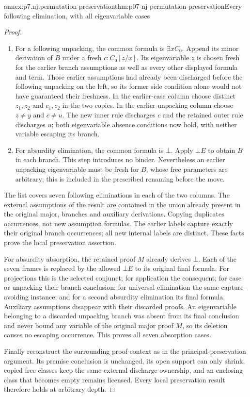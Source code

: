 \begin{annexitem}{annex:p7.nj.permutation-preservation}{thm:p07-nj-permutation-preservation}{Every following elimination, with all eigenvariable cases}
\begin{proof}
\begin{enumerate}
renamed. Thus moving the instantiation does not capture them.
The registered total substitution determines the same instance
in each branch.
\item For a following unpacking, the common formula is
\(\exists x C_0\). Append its minor derivation of \(B\)
under a fresh \(c:C_0[z/x]\). Its eigenvariable \(z\)
is chosen fresh for the earlier branch assumptions as well
as every other displayed formula and term. Those earlier
assumptions had already been discharged before the following
unpacking on the left, so its former side condition alone
would not have guaranteed their freshness. In the earlier-case
column choose distinct \(z_1,z_2\) and \(c_1,c_2\) in the
two copies. In the earlier-unpacking column choose \(z\ne y\)
and \(c\ne u\). The new inner rule discharges \(c\) and
the retained outer rule discharges \(u\); both eigenvariable
absence conditions now hold, with neither variable escaping
its branch.
\item For absurdity elimination, the common formula is
\(\bot\). Apply \(\bot E\) to obtain \(B\) in each
branch. This step introduces no binder. Nevertheless an earlier
unpacking eigenvariable must be fresh for \(B\), whose free
parameters are arbitrary; this is included in the prescribed
renaming before the move.
\end{enumerate}
The list covers seven following eliminations in each of the
two columns. The external assumptions of the result are
contained in the union already present in the original major,
branches and auxiliary derivations. Copying duplicates occurrences,
not new assumption formulas. The earlier labels capture exactly
their original branch occurrences; all new internal labels are
distinct. These facts prove the local preservation assertion.

For absurdity absorption, the retained proof \(M\) already
derives \(\bot\). Each of the seven frames is replaced by
the allowed \(\bot E\) to its original final formula.
For projections this is the selected conjunct; for application
the consequent; for case or unpacking their branch conclusion;
for universal elimination the same capture-avoiding instance;
and for a second absurdity elimination its final formula.
Auxiliary assumptions disappear with their discarded proofs.
An eigenvariable belonging to a discarded unpacking branch was
absent from its final conclusion and never bound any variable
of the original major proof \(M\), so its deletion causes
no escaping occurrence. This proves all seven absorption cases.

Finally reconstruct the surrounding proof context as in the
principal-preservation argument. Its premise conclusion is
unchanged, its open support can only shrink, copied free classes
keep the same external discharge ownership, and an enclosing
class that becomes empty remains licensed. Every local
preservation result therefore holds at arbitrary depth.
\end{proof}
\end{annexitem}

